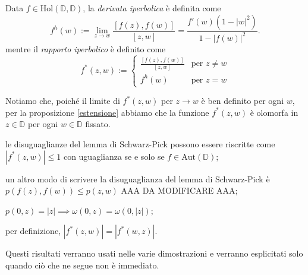 \begin{defn}
  Data $f \in \text{Hol}(\mathbb{D},\mathbb{D})$, la \textit{derivata iperbolica} è definita come
  $$f^h(w):=\lim_{z \longrightarrow w} \frac{[f(z),f(w)]}{[z,w]}=\frac{f'(w)(1-|w|^2)}{1-|f(w)|^2}.$$
  mentre il \textit{rapporto iperbolico} è definito come
  $$f^*(z,w):=\begin{cases}
    \frac{[f(z),f(w)]}{[z,w]} & \mbox{per }z\not=w \\
    f^h(w) & \mbox{per }z=w
  \end{cases}$$
\end{defn}

Notiamo che, poiché il limite di $f^*(z,w)$ per $z \longrightarrow w$ è ben definito per ogni $w$, per la proposizione \ref{estensione} abbiamo che la funzione $f^*(z,w)$ è olomorfa in $z \in \mathbb{D}$ per ogni $w \in \mathbb{D}$ fissato.

\begin{oss}
  \begin{nlist}
    \item le disuguaglianze del lemma di Schwarz-Pick possono essere riscritte come $|f^*(z,w)| \le 1$ con uguaglianza se e solo se $f \in \text{Aut}(\mathbb{D})$;
    \item  un altro modo di scrivere la disuguaglianza del lemma di Schwarz-Pick è $p(f(z),f(w)) \le p(z,w)$ AAA DA MODIFICARE AAA;
    \item $p(0,z)=|z| \implies \omega(0,z)=\omega(0,|z|)$;
    \item per definizione, $|f^*(z,w)|=|f^*(w,z)|$.
  \end{nlist}
  Questi risultati verranno usati nelle varie dimostrazioni e verranno esplicitati solo quando ciò che ne segue non è immediato.
\end{oss}
